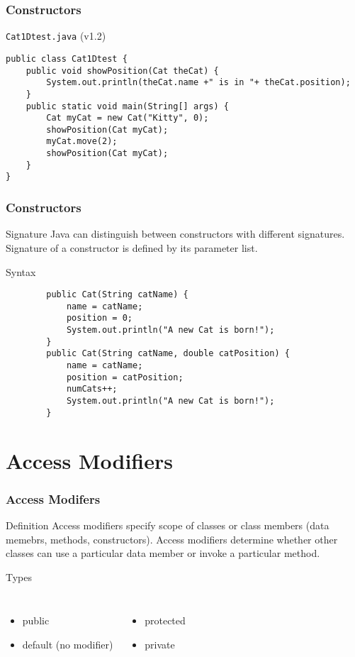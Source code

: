 \documentclass[10pt, compress]{beamer}
\begin{document}
\begin{frame}[fragile]
	\frametitle{Constructors}
	\begin{block}{\texttt{Cat1Dtest.java} (v1.2)}
		\begin{verbatim}
public class Cat1Dtest {
	public void showPosition(Cat theCat) {
		System.out.println(theCat.name +" is in "+ theCat.position);
	}
	public static void main(String[] args) {
		Cat myCat = new Cat("Kitty", 0);
		showPosition(Cat myCat);
		myCat.move(2);
		showPosition(Cat myCat);
	}
}
		\end{verbatim}
	\end{block}
\end{frame}

\begin{frame}[fragile]
	\frametitle{Constructors}
	\begin{block}{Signature}
		Java can distinguish between constructors with different signatures. Signature of a constructor is defined by its parameter list.
	\end{block}
	\begin{block}{Syntax}
		\begin{verbatim}
		public Cat(String catName) {
			name = catName;
			position = 0;
			System.out.println("A new Cat is born!");
		}
		public Cat(String catName, double catPosition) {
			name = catName;
			position = catPosition;
			numCats++;
			System.out.println("A new Cat is born!");
		}
		\end{verbatim}
	\end{block}
\end{frame}

\section{Access Modifiers}

\begin{frame}[fragile]
	\frametitle{Access Modifers}
	\begin{block}{Definition}
		Access modifiers specify scope of classes or class members (data memebrs, methods, constructors). Access modifiers determine whether other classes can use a particular data member or invoke a particular method.
	\end{block}
	\begin{block}{Types}
		\begin{columns}
			\begin{itemize}
				\item[] public
				\item[] default (no modifier)
			\end{itemize}
			\begin{itemize}
			\item[] protected
			\item[] private
			\end{itemize}
		\end{columns}
	\end{block}
\end{frame}
\end{document}
